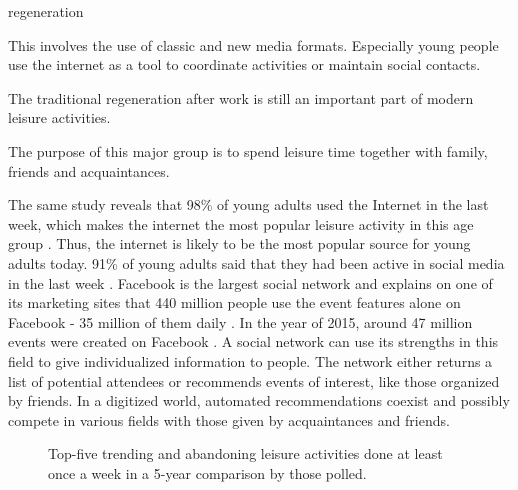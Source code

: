 \documentclass[12pt,numbers=noenddot,parskip,bibliography=totocnumbered,listof=totocnumbered,draft]{scrreprt}
\begin{document}
\begin{labeling}{regeneration}
\item[media use] This involves the use of classic and new media formats. Especially young people use the internet as a tool to coordinate activities or maintain social contacts.
\item[regeneration] The traditional regeneration after work is still an important part of modern leisure activities.
\item[socialize] The purpose of this major group is to spend leisure time together with family, friends and acquaintances.
\end{labeling}

The same study reveals that 98\% of young adults used the Internet in the last week, which makes the internet the most popular leisure activity in this age group \citep{freizeitmonitor2016}. Thus, the internet is likely to be the most popular source for young adults today. 91\% of young adults said that they had been active in social media in the last week \cite{freizeitmonitor2016}. Facebook is the largest social network and explains on one of its marketing sites that 440 million people use the event features alone on Facebook - 35 million of them daily \citep{facebook2017}. In the year of 2015, around 47 million events were created on Facebook \citep{facebook2017}. A social network can use its strengths in this field to give individualized information to people. The network either returns a list of potential attendees or recommends events of interest, like those organized by friends. In a digitized world, automated recommendations coexist and possibly compete in various fields with those given by acquaintances and friends.

\begin{figure}
\caption[Trending and abonding leisure activites]{Top-five trending and abandoning leisure activities done at least once a week in a 5-year comparison by those polled. \citep{freizeitmonitor2016}}
\label{topfivechangingleisureactivities}
\end{figure}
\end{document}
